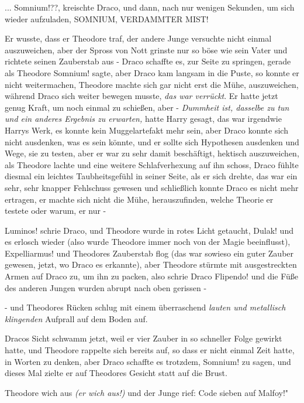 ... \glqq Somnium!??\grqq{}, kreischte Draco, und dann, nach nur wenigen
Sekunden, um sich wieder aufzuladen, \glqq SOMNIUM, VERDAMMTER MIST!\grqq{}

Er wusste, dass er Theodore traf, der andere Junge versuchte nicht einmal
auszuweichen, aber der Spross von Nott grinste nur so böse wie sein Vater und
richtete seinen Zauberstab aus - Draco schaffte es, zur Seite zu springen,
gerade als Theodore \glqq Somnium!\grqq{} sagte, aber Draco kam langsam in die
Puste, so konnte er nicht weitermachen, Theodore machte sich gar nicht erst die
Mühe, auszuweichen, während Draco sich weiter bewegen musste, \emph{das war
verrückt}. Er hatte jetzt genug Kraft, um noch einmal zu schießen, aber -
\emph{Dummheit ist, dasselbe zu tun und ein anderes Ergebnis zu erwarten,} hatte
Harry gesagt, das war irgendwie Harrys Werk, es konnte kein Muggelartefakt mehr
sein, aber Draco konnte sich nicht ausdenken, was es sein könnte, und er sollte
sich Hypothesen ausdenken und Wege, sie zu testen, aber er war zu sehr damit
beschäftigt, hektisch auszuweichen, als Theodore lachte und eine weitere
Schlafverhexung auf ihn schoss, Draco fühlte diesmal ein leichtes
Taubheitsgefühl in seiner Seite, als er sich drehte, das war ein sehr, sehr
knapper Fehlschuss gewesen und schließlich konnte Draco es nicht mehr ertragen,
er machte sich nicht die Mühe, herauszufinden, welche Theorie er testete oder
warum, er nur -

\glqq Luminos!\grqq{} schrie Draco, und Theodore wurde in rotes Licht getaucht,
\glqq Dulak!\grqq{} und es erlosch wieder (also wurde Theodore immer noch von
der Magie beeinflusst), \glqq Expelliarmus!\grqq{} und Theodores Zauberstab flog
(das war sowieso ein guter Zauber gewesen, jetzt, wo Draco es erkannte), aber
Theodore stürmte mit ausgestreckten Armen auf Draco zu, um ihn zu packen, also
schrie Draco \glqq Flipendo!\grqq{} und die Füße des anderen Jungen wurden
abrupt nach oben gerissen -

- und Theodores Rücken schlug mit einem überraschend \emph{lauten und metallisch
klingenden} Aufprall auf dem Boden auf.

Dracos Sicht schwamm jetzt, weil er vier Zauber in so schneller Folge gewirkt
hatte, und Theodore rappelte sich bereits auf, so dass er nicht einmal Zeit
hatte, in Worten zu denken, aber Draco schaffte es trotzdem, \glqq
Somnium!\grqq{} zu sagen, und dieses Mal zielte er auf Theodores Gesicht statt
auf die Brust.

Theodore wich aus \emph{(er wich aus!)} und der Junge rief: \glqq Code sieben
auf Malfoy!"

